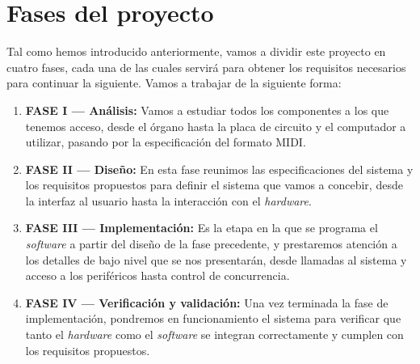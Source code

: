 \newpage

\section{Fases del proyecto}

Tal como hemos introducido anteriormente, vamos a dividir este proyecto en cuatro fases, cada una de las cuales servirá para obtener los requisitos necesarios para continuar la siguiente. Vamos a trabajar de la siguiente forma:

\begin{enumerate}
	\item \textbf{FASE I --- Análisis:} Vamos a estudiar todos los componentes a los que tenemos acceso, desde el órgano hasta la placa de circuito y el computador a utilizar, pasando por la especificación del formato \acrshort{MIDI}.
	
	\item \textbf{FASE II --- Diseño:} En esta fase reunimos las especificaciones del sistema y los requisitos propuestos para definir el sistema que vamos a concebir, desde la interfaz al usuario hasta la interacción con el \textit{hardware}.
	
	\item \textbf{FASE III --- Implementación:} Es la etapa en la que se programa el \textit{software} a partir del diseño de la fase precedente, y prestaremos atención a los detalles de bajo nivel que se nos presentarán, desde llamadas al sistema y acceso a los periféricos hasta control de concurrencia.
	
	\item \textbf{FASE IV --- Verificación y validación:} Una vez terminada la fase de implementación, pondremos en funcionamiento el sistema para verificar que tanto el \textit{hardware} como el \textit{software} se integran correctamente y cumplen con los requisitos propuestos.
	
\end{enumerate}

\newpage
\clearpage{\pagestyle{empty}\cleardoublepage}

